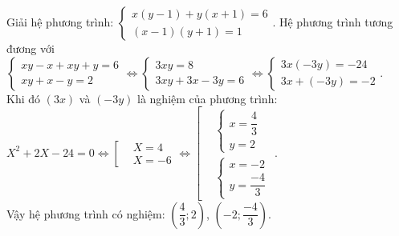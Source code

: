 \begin{ex}%
  Giải hệ phương trình: $\begin{cases} x(y-1)+ y(x+1)=6\\ (x-1)(y+1)=1 \end{cases}$.
\loigiai
    {
   Hệ phương trình tương đương với\\
   $\begin{cases} xy-x+xy+y=6\\ xy+x-y=2  \end{cases} \Leftrightarrow \begin{cases} 3xy=8\\ 3xy+3x-3y=6  \end{cases}  \Leftrightarrow \begin{cases} 3x(-3y)=-24\\ 3x+(-3y)=-2 \end{cases} $.\\
   Khi đó $(3x)$ và $(-3y)$ là nghiệm của phương trình:\\
   $X^2+2X-24=0 \Leftrightarrow \left[\begin{aligned}&X=4\\ &X=-6 \end{aligned}\right. \Leftrightarrow \left[\begin{aligned}& \begin{cases}  x=\dfrac{4}{3}\\ y=2 \end{cases}\\ &\begin{cases} x=-2\\ y= \dfrac{-4}{3} \end{cases} \end{aligned}\right.$.\\
   Vậy hệ phương trình có nghiệm: $\left(\dfrac{4}{3}; 2\right)$, $\left(-2; \dfrac{-4}{3}\right)$.
    }
\end{ex}


